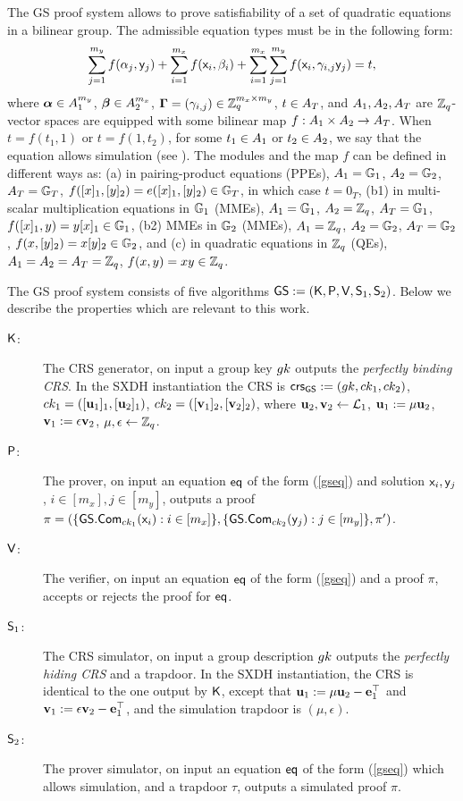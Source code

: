 The GS proof system allows to prove satisfiability of a set of quadratic equations in a bilinear group. The admissible equation types must be in the following form:
\begin{equation}\label{gseq}
\sum_{j=1}^{m_y} f(\alpha_j, \mathsf{y}_j)+\sum_{i=1}^{m_x} f(\mathsf{x}_i, \beta_i)+\sum_{i=1}^{m_x} \sum_{j=1}^{m_y}  f(\mathsf{x}_i,\gamma_{i,j} \mathsf{y}_j)=t,
\end{equation}
 where $\boldsymbol \alpha  \in A_1^{m_y}$, $\boldsymbol \beta  \in A_2^{m_x}$, $\mathbf{{\Gamma}}=(\gamma_{i,j}) \in \mathbb{Z}_q^{m_x\times m_y}$, $t \in A_T$, and $A_1,A_2,A_T$ are $\mathbb{Z}_q$-vector spaces
are equipped with some bilinear map $f:A_1\times A_2 \rightarrow A_T$.
When $t=f(t_1,1)$ or $t=f(1,t_2)$, for some $t_1\in A_1$ or $t_2\in A_2$, we say that the equation allows simulation (see \cite{SIAM:GroSah12}). The modules and the map $f$ can be defined in different ways as: (a) in pairing-product equations (PPEs), $A_1=\mathbb{G}_1$, $A_2=\mathbb{G}_2$, $A_T=\mathbb{G}_T$, $f([x]_1,[y]_2)=e([x]_1,[y]_2) \in \mathbb{G}_T$, in which case $t=0_{T}$, (b1) in multi-scalar multiplication equations in $\mathbb{G}_1$ (MMEs), $A_1=\mathbb{G}_1$, $A_2=\mathbb{Z}_q$, $A_T=\mathbb{G}_1$, $f([x]_1,y)=y [x]_1 \in \mathbb{G}_1$,  (b2) MMEs in $\mathbb{G}_2$ (MMEs),  $A_1=\mathbb{Z}_q$, $A_2=\mathbb{G}_2$, $A_T=\mathbb{G}_2$, $f(x,[y]_2)=x [y]_2 \in \mathbb{G}_2$, and (c) in quadratic equations in $\mathbb{Z}_q$ (QEs), $A_1=A_2=A_T=\mathbb{Z}_q$, $f(x,y)=xy \in \mathbb{Z}_q$. 

The GS proof system consists of five algorithms ${\mathsf{GS}}:=(\mathsf{K},\mathsf{P},\mathsf{V},\mathsf{S}_1,\mathsf{S}_2)$. Below we describe the properties which are relevant to this work.
\begin{description}
\item[$\mathsf{K}$:] The CRS generator, on input a group key ${gk}$ outputs the \emph{perfectly binding CRS}.  In the SXDH instantiation the CRS is $\mathsf{crs}_{\mathsf{GS}}:=({gk},ck_1,ck_2)$, 
$ck_1=([\mathbf{u}_1]_1,[\mathbf{u}_2]_1)$,
 $ck_2=([\mathbf{v}_1]_2,[\mathbf{v}_2]_2)$, 
 where $\mathbf{u}_2,\mathbf{v}_2 \gets \mathcal{L}_1$, $\mathbf{u}_1:=\mu \mathbf{u}_2 $, $\mathbf{v}_1:=\epsilon \mathbf{v}_2$, $\mu,\epsilon\gets\mathbb{Z}_q$.
\item[$\mathsf{P}$:] The prover, on input an equation $\mathsf{eq}$ of the form (\ref{gseq}) and solution $\mathsf{x}_i,\mathsf{y}_j$, $i\in[m_x],j\in[m_y]$, outputs a proof $\pi=(\{{\mathsf{GS}}.\mathsf{Com}_{ck_1}(\mathsf{x}_i):i\in[m_x]\},\{{\mathsf{GS}}.\mathsf{Com}_{ck_2}(\mathsf{y}_j):j\in[m_y]\},\pi')$.
\item[$\mathsf{V}$:] The verifier, on input an equation $\mathsf{eq}$ of the form (\ref{gseq}) and a proof $\pi$, accepts or rejects the proof for $\mathsf{eq}$.
\item[$\mathsf{S}_1$:]  The CRS simulator, on input a group description ${gk}$ outputs the \emph{perfectly hiding CRS}  and a trapdoor. In the SXDH instantiation, the CRS is identical to the one output by $\mathsf{K}$, except that $\mathbf{u}_1:=\mu \mathbf{u}_2-\mathbf{e}_1^\top$ and $\mathbf{v}_1:=\epsilon \mathbf{v}_2-\mathbf{e}_1^\top$, and the simulation trapdoor is $(\mu,\epsilon)$.
\item[$\mathsf{S}_2$:] The prover simulator, on input an equation $\mathsf{eq}$ of the form (\ref{gseq}) which allows simulation, and a trapdoor $\tau$, outputs a simulated proof $\pi$.
\end{description}
